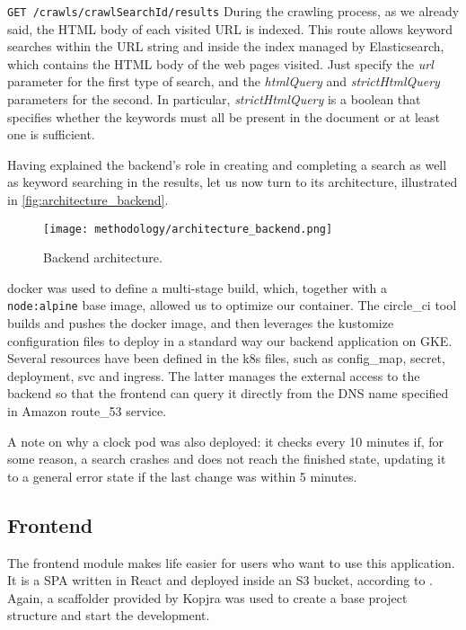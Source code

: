 \documentclass[../thesis.tex]{subfiles}
\begin{document}
\texttt{GET /crawls/{crawlSearchId}/results} During the crawling process, as we already said, the \acrshort{HTML} body of each visited \acrshort{URL} is indexed. This route allows keyword searches within the \acrshort{URL} string and inside the index managed by Elasticsearch, which contains the \acrshort{HTML} body of the web pages visited. Just specify the \textit{url} parameter for the first type of search, and the \textit{htmlQuery} and \textit{strictHtmlQuery} parameters for the second. In particular, \textit{strictHtmlQuery} is a boolean that specifies whether the keywords must all be present in the document or at least one is sufficient.

Having explained the backend's role in creating and completing a search as well as keyword searching in the results, let us now turn to its architecture, illustrated in \autoref{fig:architecture_backend}.

\begin{figure}[H]
    \centering
    \texttt{[image: methodology/architecture\_backend.png]}
    \caption[Backend architecture]{Backend architecture.}
    \label{fig:architecture_backend}
\end{figure}

\gls{docker} was used to define a multi-stage build, which, together with a \texttt{node:alpine} base image, allowed us to optimize our \gls{container}. The \gls{circle_ci} tool builds and pushes the \gls{docker} image, and then leverages the \gls{kustomize} configuration files to deploy in a standard way our backend application on \acrfull{GKE}. Several resources have been defined in the \gls{k8s} files, such as \gls{config_map}, \gls{secret}, \gls{deployment}, \gls{svc} and \gls{ingress}. The latter manages the external access to the backend so that the frontend can query it directly from the \acrshort{DNS} name specified in Amazon \gls{route_53} service.

A note on why a clock \gls{pod} was also deployed: it checks every 10 minutes if, for some reason, a search crashes and does not reach the finished state, updating it to a general error state if the last change was within 5 minutes.

\subsection{Frontend}
The frontend module makes life easier for users who want to use this application. It is a \acrshort{SPA} written in React and deployed inside an \acrshort{S3} bucket, according to \cite{site:deploy_react_s3}. Again, a scaffolder provided by Kopjra was used to create a base project structure and start the development.
\end{document}
